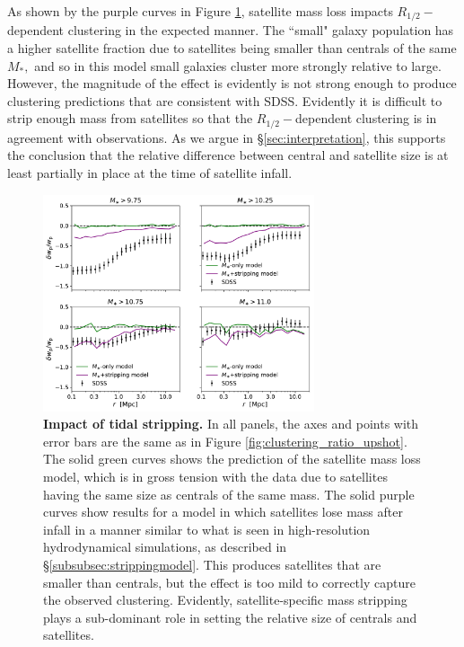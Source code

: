 \documentclass[usenatbib,usegraphicx,letterpaper]{mn2e}
\newcommand{\rhalf}{R_{1/2}}
\newcommand{\mstar}{M_{\ast}}
\begin{document}
As shown by the purple curves in Figure \ref{fig:mstarmodelclustering}, satellite mass loss impacts $\rhalf-$dependent clustering in the expected manner. The ``small" galaxy population has a higher satellite fraction due to satellites being smaller than centrals of the same $\mstar,$ and so in this model small galaxies cluster more strongly relative to large. However, the magnitude of the effect is evidently is not strong enough to produce clustering predictions that are consistent with SDSS. Evidently it is difficult to strip enough mass from satellites so that the $\rhalf-$dependent clustering is in agreement with observations. As we argue in \S\ref{sec:interpretation}, this supports the conclusion that the relative difference between central and satellite size is at least partially in place at the time of satellite infall.

\begin{figure}
\centering
\includegraphics[width=8cm]{FIGS/alt_model_wp_ratios.pdf}
\caption{
{\bf Impact of tidal stripping.}
In all panels, the axes and points with error bars are the same as in Figure \ref{fig:clustering_ratio_upshot}. The solid green curves shows the prediction of the satellite mass loss model, which is in gross tension with the data due to satellites having the same size as centrals of the same mass. The solid purple curves show results for a model in which satellites lose mass after infall in a manner similar to what is seen in high-resolution hydrodynamical simulations, as described in \S\ref{subsubsec:strippingmodel}. This produces satellites that are smaller than centrals, but the effect is too mild to correctly capture the observed clustering. Evidently, satellite-specific mass stripping plays a sub-dominant role in setting the relative size of centrals and satellites.
}
\label{fig:mstarmodelclustering}
\end{figure}
\end{document}
